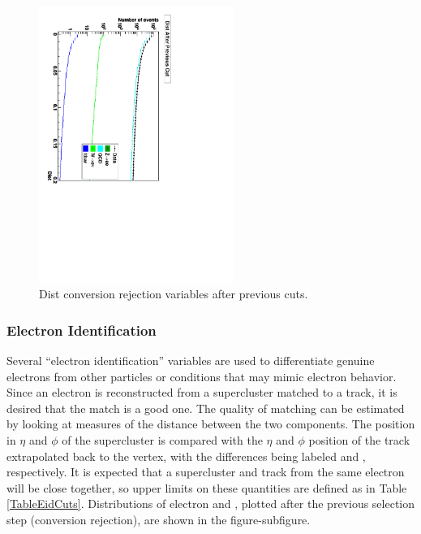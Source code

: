  \begin{figure}[htb]
  \begin{center}
    \includegraphics[width=180pt, angle=90]{Figures/distSeq.pdf}
  \end{center}
  \caption[Dist conversion rejection variables after previous cuts]{Dist conversion rejection variables after previous cuts.}
  \label{fig:DistConvRejVars}
 \end{figure}


\subsubsection{Electron Identification}
Several ``electron identification'' variables are used to differentiate genuine electrons 
from other particles or conditions that may mimic electron behavior.  
Since an electron is reconstructed from a supercluster matched to a track, it is desired that the match is a good one.
The quality of matching can be estimated by looking at measures of the distance between the two components.
The position in $ \eta $ and $ \phi $ of the supercluster is compared with 
the $ \eta $ and $ \phi $ position of the track extrapolated back to the vertex, 
with the differences being labeled \detain and \dphiin, respectively.  
It is expected that a supercluster and track from the same electron will be close together, 
so upper limits on these quantities are defined as in Table \ref{TableEidCuts}.  
Distributions of electron \detain and \dphiin, plotted after the previous selection step (conversion rejection),
are shown in the figure-subfigure.  

